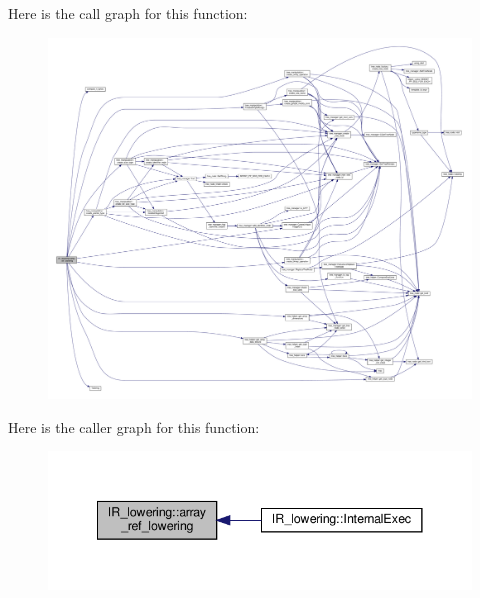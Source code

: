 Here is the call graph for this function\+:
\nopagebreak
\begin{figure}[H]
\begin{center}
\leavevmode
\includegraphics[width=350pt]{df/d7d/classIR__lowering_adaba1afb2ed746864d7e0bc9d2b1c25d_cgraph}
\end{center}
\end{figure}
Here is the caller graph for this function\+:
\nopagebreak
\begin{figure}[H]
\begin{center}
\leavevmode
\includegraphics[width=341pt]{df/d7d/classIR__lowering_adaba1afb2ed746864d7e0bc9d2b1c25d_icgraph}
\end{center}
\end{figure}
\mbox{\label{classIR__lowering_a071c0cd6fc3ab02d7c7581426abe47a4}} 
